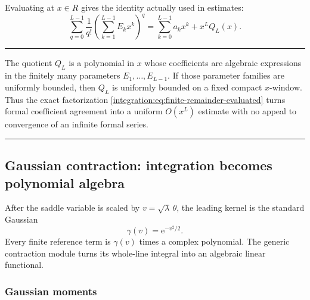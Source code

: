 \documentclass[11pt,oneside]{article}
\theoremstyle{definition}
\theoremstyle{remark}
\newcommand{\e}{\mathrm e}
\newenvironment{boxedremark}{%
  \par\smallskip\noindent\begin{center}\begin{minipage}{0.94\textwidth}%
  \color{black}\hrule\vspace{0.6em}\small
}{%
  \vspace{0.6em}\hrule\end{minipage}\end{center}\smallskip
}
\begin{document}
Evaluating at $x\in R$ gives the identity actually used in estimates:
\begin{equation}
 \sum_{q=0}^{L-1}\frac1{q!}
 \left(\sum_{k=1}^{L-1}E_kx^k\right)^q
 =\sum_{k=0}^{L-1}a_kx^k+x^LQ_L(x).
 \label{integration:eq:finite-remainder-evaluated}
\end{equation}

\begin{boxedremark}
The quotient $Q_L$ is a polynomial in $x$ whose coefficients are algebraic expressions in
the finitely many parameters $E_1,\ldots,E_{L-1}$.  If those parameter families are uniformly
bounded, then $Q_L$ is uniformly bounded on a fixed compact $x$-window.  Thus the exact
factorization \eqref{integration:eq:finite-remainder-evaluated} turns formal coefficient agreement into a
uniform $O(x^L)$ estimate with no appeal to convergence of an infinite formal series.
\end{boxedremark}

\subsection{Gaussian contraction: integration becomes polynomial algebra}
\label{integration:sec:gaussian-contraction}

After the saddle variable is scaled by $v=\sqrt{\lambda}\,\theta$, the leading kernel is the
standard Gaussian
\begin{equation}
 \gamma(v)=\e^{-v^2/2}.
 \label{integration:eq:standard-gaussian-kernel}
\end{equation}
Every finite reference term is $\gamma(v)$ times a complex polynomial.  The generic
contraction module turns its whole-line integral into an algebraic linear functional.

\subsubsection{Gaussian moments}
\end{document}
